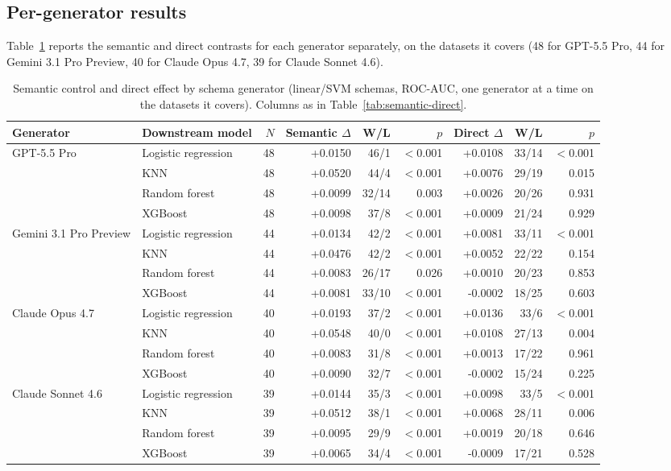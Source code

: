 \subsection*{Per-generator results}

Table~\ref{tab:generators} reports the semantic and direct contrasts for each generator separately, on the datasets it covers (48 for GPT-5.5 Pro, 44 for Gemini 3.1 Pro Preview, 40 for Claude Opus 4.7, 39 for Claude Sonnet 4.6).

\begin{table}[tbp]
\caption{Semantic control and direct effect by schema generator (linear/SVM schemas, ROC-AUC, one generator at a time on the datasets it covers). Columns as in Table~\ref{tab:semantic-direct}.}\label{tab:generators}
\centering
\small
\begin{adjustbox}{max width=\linewidth}
\begin{tabular}{llrrrrrrr}
\toprule
Generator & Downstream model & \(N\) & Semantic \(\Delta\) & W/L & \(p\) & Direct \(\Delta\) & W/L & \(p\) \\
\midrule
GPT-5.5 Pro & Logistic regression & 48 & +0.0150 & 46/1 & $<$0.001 & +0.0108 & 33/14 & $<$0.001 \\
 & KNN & 48 & +0.0520 & 44/4 & $<$0.001 & +0.0076 & 29/19 & 0.015 \\
 & Random forest & 48 & +0.0099 & 32/14 & 0.003 & +0.0026 & 20/26 & 0.931 \\
 & XGBoost & 48 & +0.0098 & 37/8 & $<$0.001 & +0.0009 & 21/24 & 0.929 \\
\midrule
Gemini 3.1 Pro Preview & Logistic regression & 44 & +0.0134 & 42/2 & $<$0.001 & +0.0081 & 33/11 & $<$0.001 \\
 & KNN & 44 & +0.0476 & 42/2 & $<$0.001 & +0.0052 & 22/22 & 0.154 \\
 & Random forest & 44 & +0.0083 & 26/17 & 0.026 & +0.0010 & 20/23 & 0.853 \\
 & XGBoost & 44 & +0.0081 & 33/10 & $<$0.001 & -0.0002 & 18/25 & 0.603 \\
\midrule
Claude Opus 4.7 & Logistic regression & 40 & +0.0193 & 37/2 & $<$0.001 & +0.0136 & 33/6 & $<$0.001 \\
 & KNN & 40 & +0.0548 & 40/0 & $<$0.001 & +0.0108 & 27/13 & 0.004 \\
 & Random forest & 40 & +0.0083 & 31/8 & $<$0.001 & +0.0013 & 17/22 & 0.961 \\
 & XGBoost & 40 & +0.0090 & 32/7 & $<$0.001 & -0.0002 & 15/24 & 0.225 \\
\midrule
Claude Sonnet 4.6 & Logistic regression & 39 & +0.0144 & 35/3 & $<$0.001 & +0.0098 & 33/5 & $<$0.001 \\
 & KNN & 39 & +0.0512 & 38/1 & $<$0.001 & +0.0068 & 28/11 & 0.006 \\
 & Random forest & 39 & +0.0095 & 29/9 & $<$0.001 & +0.0019 & 20/18 & 0.646 \\
 & XGBoost & 39 & +0.0065 & 34/4 & $<$0.001 & -0.0009 & 17/21 & 0.528 \\
\bottomrule
\end{tabular}
\end{adjustbox}
\end{table}

